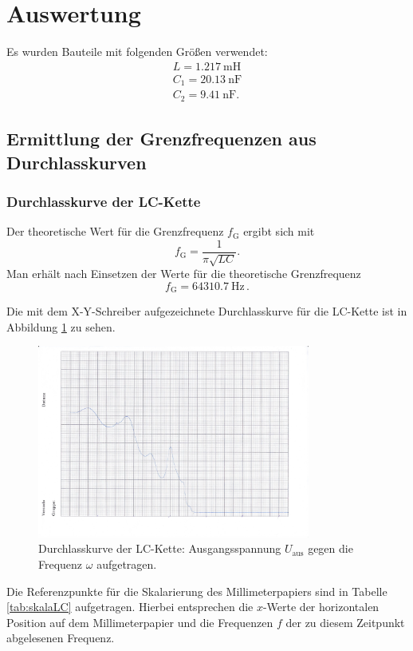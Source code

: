 \section{Auswertung}
\label{sec:Auswertung}

Es wurden Bauteile mit folgenden Größen verwendet:
\begin{gather*}
	L = \SI{1.217}{\milli\henry} \\
	C_1 = \SI{20.13}{\nano\farad} \\
	C_2 = \SI{9.41}{\nano\farad} \text{.}
\end{gather*}


\subsection{Ermittlung der Grenzfrequenzen aus Durchlasskurven}

\subsubsection{Durchlasskurve der LC-Kette}
Der theoretische Wert für die Grenzfrequenz $f_{\text{G}}$ ergibt sich mit
\begin{equation}
	f_{\text{G}} = \frac{1}{\pi \sqrt{LC}} \text{.}
\end{equation}
Man erhält nach Einsetzen der Werte für die theoretische Grenzfrequenz
\begin{equation*}
	f_{\text{G}} = \SI{64310.7}{\hertz} \, \text{.}
\end{equation*}

Die mit dem X-Y-Schreiber aufgezeichnete Durchlasskurve für die LC-Kette ist in Abbildung
\ref{fig:durchiLC} zu sehen.
\begin{figure}
	\centering
	\includegraphics[width=0.8\textwidth]{Bilder/durchlasskurve_lc_kette.jpg}
	\caption{Durchlasskurve der LC-Kette: Ausgangsspannung $U_{\text{aus}}$ gegen die
		Frequenz $\omega$ aufgetragen.}
	\label{fig:durchiLC}
\end{figure}
Die Referenzpunkte für die Skalarierung des Millimeterpapiers sind in Tabelle
\ref{tab:skalaLC} aufgetragen. Hierbei entsprechen die $x$-Werte der horizontalen Position
auf dem Millimeterpapier und die Frequenzen $f$ der zu diesem Zeitpunkt abgelesenen Frequenz.

